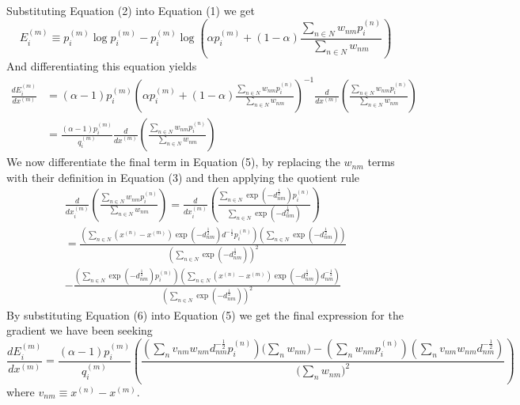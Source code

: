 \documentclass[11pt]{article} %
\begin{document}
Substituting Equation (2) into Equation (1) we get
\begin{equation*}
E^{(m)}_i \equiv p^{(m)}_i \log p^{(m)}_i - p^{(m)}_i \log \left( \alpha p^{(m)}_i + (1 - \alpha)\frac{\sum_{n \in N}w_{nm}p^{(n)}_i}{\sum_{n \in N}w_{nm}} \right)
\end{equation*}
And differentiating this equation yields
\begin{align*}
\frac{dE^{(m)}_i}{dx^{(m)}} &=
(\alpha - 1)p^{(m)}_i \left( \alpha p^{(m)}_i + (1 - \alpha)\frac{\sum_{n \in N}w_{nm}p^{(n)}_i}{\sum_{n \in N}w_{nm}} \right)^{-1} \frac{d}{dx^{(m)}}\left( \frac{\sum_{n \in N}w_{nm}p^{(n)}_i}{\sum_{n \in N}w_{nm}} \right)\\
&= \frac{(\alpha - 1)p^{(m)}_i}{q^{(m)}_i}\frac{d}{dx^{(m)}}\left( \frac{\sum_{n \in N}w_{nm}p^{(n)}_i}{\sum_{n \in N}w_{nm}} \right)
\tag{5}
\end{align*}
We now differentiate the final term in Equation (5), by replacing the $w_{nm}$ terms with their definition in Equation (3) and then applying the quotient rule
\begin{align*}
\frac{d}{dx^{(m)}_i}\left(\frac{\sum_{n \in N}w_{nm}p^{(n)}_i}{\sum_{n \in N}w_{nm}}\right) = \frac{d}{dx^{(m)}_i}\left(\frac{\sum_{n \in N}\exp(-d_{nm}^{\frac{1}{2}})p^{(n)}_i}{\sum_{n \in N}\exp(-d_{nm}^{\frac{1}{2}})}\right)\\
= \frac{\left(\sum_{n \in N}\left(x^{(n)}-x^{(m)}\right)\exp(-d_{nm}^{\frac{1}{2}})d^{-\frac{1}{2}}p^{(n)}_i\right)\left(\sum_{n \in N}\exp(-d_{nm}^{\frac{1}{2}})\right)}{\left(\sum_{n \in N}\exp(-d_{nm}^{\frac{1}{2}})\right)^2}\\
- \frac{\left(\sum_{n \in N}\exp(-d_{nm}^{\frac{1}{2}})p^{(n)}_i\right)\left(\sum_{n \in N}\left(x^{(n)}-x^{(m)}\right)\exp(-d_{nm}^{\frac{1}{2}})d_{nm}^{-\frac{1}{2}}\right)}{\left(\sum_{n \in N}\exp(-d_{nm}^{\frac{1}{2}})\right)^2}
\tag{6}
\end{align*}
By substituting Equation (6) into Equation (5) we get the final expression for the gradient we have been seeking
\begin{equation*}
\frac{dE^{(m)}_i}{dx^{(m)}} = \frac{(\alpha - 1)p^{(m)}_i}{q^{(m)}_i} \left(\frac{\left(\sum_n v_{nm}w_{nm}d_{nm}^{-\frac{1}{2}}p^{(n)}_i\right)\biggl(\sum_n w_{nm}\biggr) - \left(\sum_n w_{nm}p^{(n)}_i\right)\left(\sum_n v_{nm}w_{nm}d_{nm}^{-\frac{1}{2}}\right)}{\biggl(\sum_n w_{nm}\biggr)^2}\right)
\tag{7}
\end{equation*}
where $v_{nm} \equiv x^{(n)} - x^{(m)}$.
\end{document}
